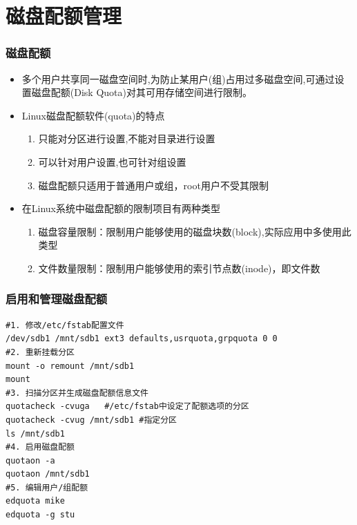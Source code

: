 \documentclass[xcolor=svgnames,presentation]{beamer}
\begin{document}
\section{磁盘配额管理}
\label{sec-6}
\begin{frame}
\frametitle{磁盘配额}
\label{sec-6-1}
\begin{itemize}

\item 多个用户共享同一磁盘空间时,为防止某用户(组)占用过多磁盘空间,可通过设置磁盘配额(Disk Quota)对其可用存储空间进行限制。
\label{sec-6-1-1}%

\item Linux磁盘配额软件(quota)的特点
\label{sec-6-1-2}%
\begin{enumerate}
\item 只能对分区进行设置,不能对目录进行设置
\item 可以针对用户设置,也可针对组设置
\item 磁盘配额只适用于普通用户或组，root用户不受其限制
\end{enumerate}

\item 在Linux系统中磁盘配额的限制项目有两种类型
\label{sec-6-1-3}%
\begin{enumerate}
\item 磁盘容量限制：限制用户能够使用的磁盘块数(block),实际应用中多使用此类型
\item 文件数量限制：限制用户能够使用的索引节点数(inode)，即文件数
\end{enumerate}
\end{itemize} %
\end{frame}
\begin{frame}[fragile]
\frametitle{启用和管理磁盘配额}
\label{sec-6-2}


\begin{verbatim}
#1. 修改/etc/fstab配置文件
/dev/sdb1 /mnt/sdb1 ext3 defaults,usrquota,grpquota 0 0
#2. 重新挂载分区
mount -o remount /mnt/sdb1
mount
#3. 扫描分区并生成磁盘配额信息文件
quotacheck -cvuga   #/etc/fstab中设定了配额选项的分区
quotacheck -cvug /mnt/sdb1 #指定分区
ls /mnt/sdb1
#4. 启用磁盘配额
quotaon -a
quotaon /mnt/sdb1
#5. 编辑用户/组配额
edquota mike
edquota -g stu
\end{verbatim}
\end{frame}
\end{document}

